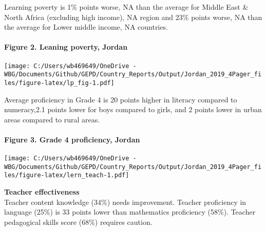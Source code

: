 \documentclass[twocolumn]{article}
\let\oldparagraph\paragraph
\renewcommand{\paragraph}[1]{\oldparagraph{#1}\mbox{}}
\begin{document}
Learning poverty is 1\% points worse, NA than the average for Middle
East \& North Africa (excluding high income), NA region and 23\% points
worse, NA than the average for Lower middle income, NA countries.

\hypertarget{figure-2.-leaning-poverty-jordan}{%
\paragraph{Figure 2. Leaning poverty,
Jordan}\label{figure-2.-leaning-poverty-jordan}}

\texttt{[image: C:/Users/wb469649/OneDrive - WBG/Documents/Github/GEPD/Country\_Reports/Output/Jordan\_2019\_4Pager\_files/figure-latex/lp\_fig-1.pdf]}

Average proficiency in Grade 4 is 20 points higher in literacy compared
to numeracy,2.1 points lower for boys compared to girls, and 2 points
lower in urban areas compared to rural areas.

\hypertarget{figure-3.-grade-4-proficiency-jordan}{%
\paragraph{Figure 3. Grade 4 proficiency,
Jordan}\label{figure-3.-grade-4-proficiency-jordan}}

\texttt{[image: C:/Users/wb469649/OneDrive - WBG/Documents/Github/GEPD/Country\_Reports/Output/Jordan\_2019\_4Pager\_files/figure-latex/lern\_teach-1.pdf]}

\textbf{Teacher effectiveness}\\
Teacher content knowledge (34\%) needs improvement. Teacher proficiency
in language (25\%) is 33 points lower than mathematics proficiency
(58\%). Teacher pedagogical skills score (68\%) requires caution.
\end{document}
